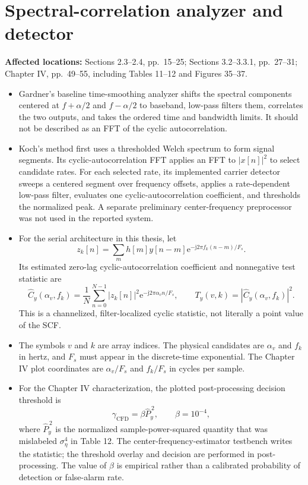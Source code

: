 \documentclass[12pt]{article}
\begin{document}
\section{Spectral-correlation analyzer and detector}

\noindent\textbf{Affected locations:} Sections 2.3--2.4, pp.~15--25; Sections 3.2--3.3.1, pp.~27--31; Chapter IV, pp.~49--55, including Tables 11--12 and Figures 35--37.

\begin{itemize}
  \item Gardner's baseline time-smoothing analyzer shifts the spectral components centered at $f+\alpha/2$ and $f-\alpha/2$ to baseband, low-pass filters them, correlates the two outputs, and takes the ordered time and bandwidth limits. It should not be described as an FFT of the cyclic autocorrelation.

  \item Koch's method first uses a thresholded Welch spectrum to form signal segments. Its cyclic-autocorrelation FFT applies an FFT to $|x[n]|^2$ to select candidate rates. For each selected rate, its implemented carrier detector sweeps a centered segment over frequency offsets, applies a rate-dependent low-pass filter, evaluates one cyclic-autocorrelation coefficient, and thresholds the normalized peak. A separate preliminary center-frequency preprocessor was not used in the reported system.

  \item For the serial architecture in this thesis, let
  \[
    z_k[n]=\sum_m h[m]y[n-m]
      \mathrm{e}^{-\mathrm{j}2\pi f_k(n-m)/F_s}.
  \]
  Its estimated zero-lag cyclic-autocorrelation coefficient and nonnegative test statistic are
  \[
    \widehat{C}_y(\alpha_v,f_k)=\frac{1}{N}\sum_{n=0}^{N-1}|z_k[n]|^2
      \mathrm{e}^{-\mathrm{j}2\pi\alpha_v n/F_s},
    \qquad
    T_y(v,k)=|\widehat{C}_y(\alpha_v,f_k)|^2.
  \]
  This is a channelized, filter-localized cyclic statistic, not literally a point value of the SCF.

  \item The symbols $v$ and $k$ are array indices. The physical candidates are $\alpha_v$ and $f_k$ in hertz, and $F_s$ must appear in the discrete-time exponential. The Chapter IV plot coordinates are $\alpha_v/F_s$ and $f_k/F_s$ in cycles per sample.

  \item For the Chapter IV characterization, the plotted post-processing decision threshold is
  \[
    \gamma_{\mathrm{CFD}}=\beta\widehat P_y^{\,2},\qquad \beta=10^{-4},
  \]
  where $\widehat P_y^{\,2}$ is the normalized sample-power-squared quantity that was mislabeled $\sigma_\eta^4$ in Table 12. The center-frequency-estimator testbench writes the statistic; the threshold overlay and decision are performed in post-processing. The value of $\beta$ is empirical rather than a calibrated probability of detection or false-alarm rate.


\end{itemize}
\end{document}
